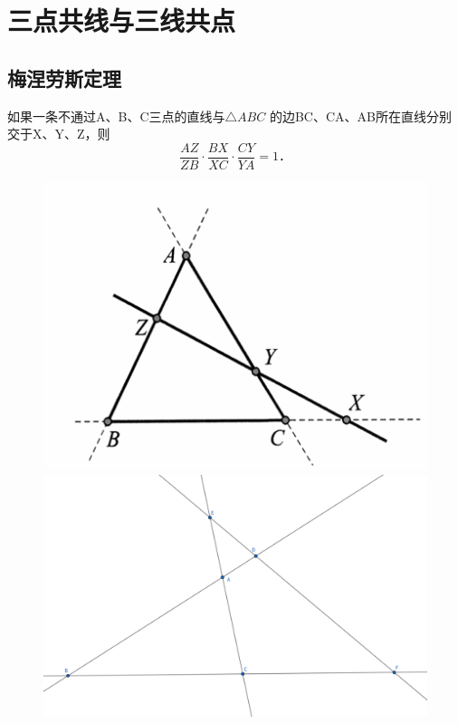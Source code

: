 \section{三点共线与三线共点}
\subsection{梅涅劳斯定理}
\begin{theorem}
    如果一条不通过A、B、C三点的直线与$\triangle ABC$ 的边BC、CA、AB所在直线分别交于X、Y、Z，则 
    $$\frac{A Z}{Z B} \cdot \frac{B X}{X C} \cdot \frac{C Y}{Y A}=1．$$ 
\end{theorem}


\begin{figure}[htbp]
    \centering
    \hfill %
    \begin{minipage}[t]{0.45\textwidth}
        \centering
        \includegraphics[width=\linewidth]{figures/menelaus.png}
    \end{minipage}
    \hfill %
    \begin{minipage}[t]{0.45\textwidth}
    \centering
    \includegraphics[width=\linewidth]{figures/menelaus (1).png}
    \end{minipage}
\end{figure}



